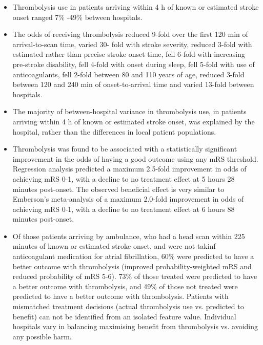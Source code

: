 \begin{itemize}
    \item Thrombolysis use in patients arriving within 4 h of known or estimated stroke onset ranged 7\% -49\% between hospitals. 
    
    \item The odds of receiving thrombolysis reduced 9-fold over the first 120 min of arrival-to-scan time, varied 30- fold with stroke severity, reduced 3-fold with estimated rather than precise stroke onset time, fell 6-fold with increasing pre-stroke disability, fell 4-fold with onset during sleep, fell 5-fold with use of anticoagulants, fell 2-fold between 80 and 110 years of age, reduced 3-fold between 120 and 240 min of onset-to-arrival time and varied 13-fold between hospitals. 
    
    \item The majority of between-hospital variance in thrombolysis use, in patients arriving within 4 h of known or estimated stroke onset, was explained by the hospital, rather than the differences in local patient populations.
    
    \item Thrombolysis was found to be associated with a statistically significant improvement in the odds of having a good outcome using any mRS threshold. Regression analysis predicted a maximum 2.5-fold improvement in odds of achieving mRS 0-1, with a decline to no treatment effect at 5 hours 28 minutes post-onset. The observed beneficial effect is very similar to Emberson’s meta-analysis of a maximum 2.0-fold improvement in odds of achieving mRS 0-1, with a decline to no treatment effect at 6 hours 88 minutes post-onset.
    
    \item Of those patients arriving by ambulance, who had a head scan within 225 minutes of known or estimated stroke onset, and were not takinf anticoagulant medication for atrial fibrillation, 60\% were predicted to have a better outcome with thrombolysis (improved probability-weighted mRS and reduced probability of mRS 5-6). 73\% of those treated were predicted to have a better outcome with thrombolysis, and 49\% of those not treated were predicted to have a better outcome with thrombolysis. Patients with mismatched treatment decisions (actual thrombolysis use vs. predicted to benefit) can not be identified from an isolated feature value. Individual hospitals vary in balancing maximising benefit from thrombolysis vs. avoiding any possible harm.
    

\end{itemize}
